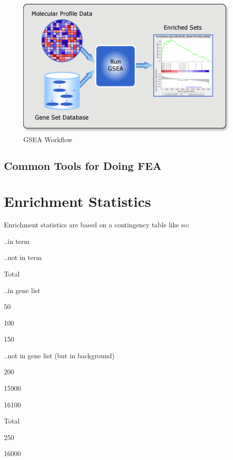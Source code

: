 \documentclass[
]{book}
\begin{document}
\begin{figure}

{\centering \includegraphics[width=1\linewidth]{images/GSEA-homegraphic} 

}

\caption{GSEA Workflow}\label{fig:unnamed-chunk-10}
\end{figure}

\hypertarget{common-tools-for-doing-fea}{%
\section{Common Tools for Doing FEA}\label{common-tools-for-doing-fea}}

\hypertarget{enrichment-statistics}{%
\chapter{Enrichment Statistics}\label{enrichment-statistics}}

Enrichment statistics are based on a contingency table like so:

..in term

..not in term

Total

..in gene list

50

100

150

..not in gene list (but in background)

200

15900

16100

Total

250

16000
\end{document}
